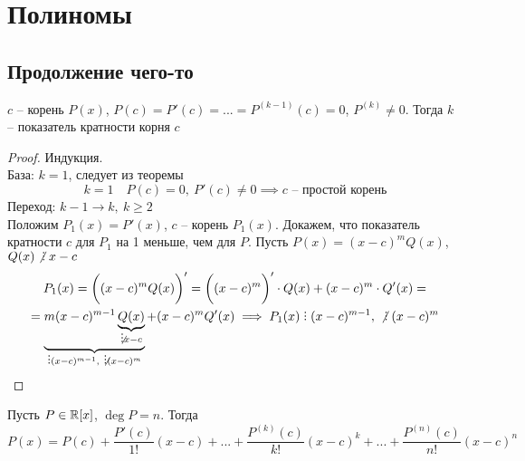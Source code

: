 \chapter{Полиномы}

\section{Продолжение чего-то}

\begin{implication}
    $c$ -- корень $P(x)$, $P(c) = P'(c) = ... = P^{(k-1)}(c) = 0$, $P^{(k)}\ne 0$. Тогда $k$ -- показатель кратности корня $c$
\end{implication}

\begin{proof}
	Индукция. \\
    База: $k = 1$, следует из теоремы
    $$k = 1 \quad P(c) = 0, ~ P'(c) \ne 0 \implies c \text{ -- простой корень} $$
    Переход: $k - 1 \to k, ~ k \ge 2$ \\
    Положим $P_1(x) = P'(x)$, $c$ -- корень $P_1(x)$. Докажем, что показатель кратности $c$ для $P_1$ на 1 меньше, чем для $P$. Пусть $P(x) = (x - c)^m Q(x)$, $Q(x) \ndivby x - c$
    \begin{multline*}
        P_1(x) = \bigg((x-c)^mQ(x)\bigg)' = \bigg((x-c)^m\bigg)' \cdot Q(x) + (x-c)^m \cdot Q'(x) = \\ = \underbrace{m(x - c)^{m-1}\underbrace{Q(x)}_{\ndivby x-c}}_{\divby (x-c)^{m-1}, ~ \ndivby (x-c)^m} + (x - c)^m Q'(x) \implies P_1(x) \divby (x-c)^{m-1}, ~ \ndivby (x-c)^m
    \end{multline*}
\end{proof}

\begin{theorem}
    Пусть $P \in \mathbb{R}[x]$, $\deg P = n$. Тогда
    $$ P(x) = P(c) + \frac{P'(c)}{1!}(x-c) + ... + \frac{P^{(k)}(c)}{k!}(x-c)^k + ... + \frac{P^{(n)}(c)}{n!}(x-c)^n $$
\end{theorem}

